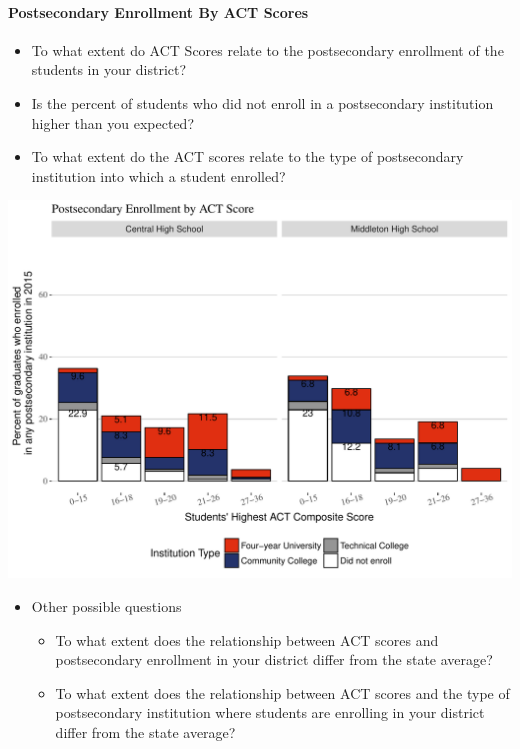 \documentclass[11pt,]{article}
\providecommand{\tightlist}{%
  \setlength{\itemsep}{0pt}\setlength{\parskip}{0pt}}
\let\oldparagraph\paragraph
\renewcommand{\paragraph}[1]{\oldparagraph{#1}\mbox{}}
\begin{document}
\newpage

\paragraph{Postsecondary Enrollment By ACT
Scores}\label{postsecondary-enrollment-by-act-scores}

\begin{itemize}
\tightlist
\item
  To what extent do ACT Scores relate to the postsecondary enrollment of
  the students in your district?\\
\item
  Is the percent of students who did not enroll in a postsecondary
  institution higher than you expected?
\item
  To what extent do the ACT scores relate to the type of postsecondary
  institution into which a student enrolled?
\end{itemize}

\includegraphics{20170419_PSWRR_files/figure-latex/Figure7a-1.pdf}

\begin{itemize}
\tightlist
\item
  Other possible questions

  \begin{itemize}
  \tightlist
  \item
    To what extent does the relationship between ACT scores and
    postsecondary enrollment in your district differ from the state
    average?
  \item
    To what extent does the relationship between ACT scores and the type
    of postsecondary institution where students are enrolling in your
    district differ from the state average?
  \end{itemize}
\end{itemize}
\end{document}
